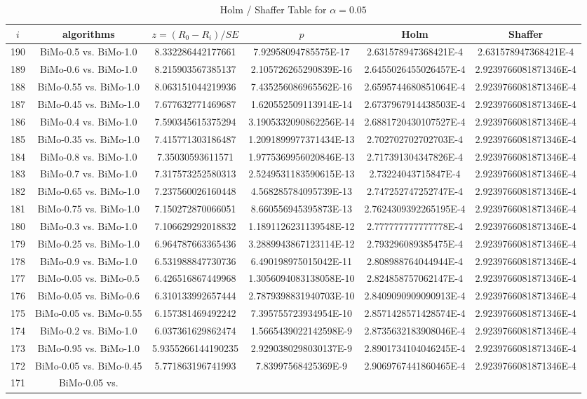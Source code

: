 \documentclass[a4paper,10pt]{article}
\begin{document}
\begin{landscape}
\begin{table}[!htp]
\centering\tiny
\caption{Holm / Shaffer Table for $\alpha=0.05$}
\begin{tabular}{cccccc}
$i$&algorithms&$z=(R_0 - R_i)/SE$&$p$&Holm&Shaffer\\
\hline
190&BiMo-0.5 vs. BiMo-1.0&8.332286442177661&7.92958094785575E-17&2.631578947368421E-4&2.631578947368421E-4\\189&BiMo-0.6 vs. BiMo-1.0&8.215903567385137&2.105726265290839E-16&2.6455026455026457E-4&2.9239766081871346E-4\\188&BiMo-0.55 vs. BiMo-1.0&8.063151044219936&7.435256086965562E-16&2.6595744680851064E-4&2.9239766081871346E-4\\187&BiMo-0.45 vs. BiMo-1.0&7.677632771469687&1.620552509113914E-14&2.6737967914438503E-4&2.9239766081871346E-4\\186&BiMo-0.4 vs. BiMo-1.0&7.590345615375294&3.1905332090862256E-14&2.6881720430107527E-4&2.9239766081871346E-4\\185&BiMo-0.35 vs. BiMo-1.0&7.415771303186487&1.2091899977371434E-13&2.702702702702703E-4&2.9239766081871346E-4\\184&BiMo-0.8 vs. BiMo-1.0&7.35030593611571&1.9775369956020846E-13&2.717391304347826E-4&2.9239766081871346E-4\\183&BiMo-0.7 vs. BiMo-1.0&7.317573252580313&2.5249531183590615E-13&2.73224043715847E-4&2.9239766081871346E-4\\182&BiMo-0.65 vs. BiMo-1.0&7.237560026160448&4.568285784095739E-13&2.747252747252747E-4&2.9239766081871346E-4\\181&BiMo-0.75 vs. BiMo-1.0&7.150272870066051&8.660556945395873E-13&2.7624309392265195E-4&2.9239766081871346E-4\\180&BiMo-0.3 vs. BiMo-1.0&7.106629292018832&1.1891126231139548E-12&2.777777777777778E-4&2.9239766081871346E-4\\179&BiMo-0.25 vs. BiMo-1.0&6.964787663365436&3.2889943867123114E-12&2.793296089385475E-4&2.9239766081871346E-4\\178&BiMo-0.9 vs. BiMo-1.0&6.531988847730736&6.490198975015042E-11&2.808988764044944E-4&2.9239766081871346E-4\\177&BiMo-0.05 vs. BiMo-0.5&6.426516867449968&1.3056094083138058E-10&2.824858757062147E-4&2.9239766081871346E-4\\176&BiMo-0.05 vs. BiMo-0.6&6.310133992657444&2.7879398831940703E-10&2.8409090909090913E-4&2.9239766081871346E-4\\175&BiMo-0.05 vs. BiMo-0.55&6.157381469492242&7.395755723934954E-10&2.8571428571428574E-4&2.9239766081871346E-4\\174&BiMo-0.2 vs. BiMo-1.0&6.037361629862474&1.5665439022142598E-9&2.8735632183908046E-4&2.9239766081871346E-4\\173&BiMo-0.95 vs. BiMo-1.0&5.9355266144190235&2.9290380298030137E-9&2.8901734104046245E-4&2.9239766081871346E-4\\172&BiMo-0.05 vs. BiMo-0.45&5.771863196741993&7.83997568425369E-9&2.9069767441860465E-4&2.9239766081871346E-4\\171&BiMo-0.05 vs. 
\end{tabular}
\end{table}
\end{landscape}
\end{document}
